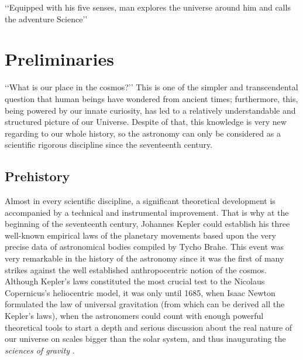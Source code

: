 \begin{savequote}[50mm]
‘‘Equipped with his five senses, man explores the universe around him and 
calls the adventure Science’’
\end{savequote}




\chapter{Preliminaries}
\label{cha:Introduction}


‘‘What is our place in the cosmos?’’ This is one of the simpler and 
trans\-cendental question that human beings have wondered from ancient 
times; furthermore, this, being powered by our innate curiosity, has led to 
a relatively understandable and structured picture of our Universe. Despite 
of that, this knowledge is very new regarding to our whole history, so the 
astronomy can only be considered as a scientific rigorous discipline since 
the seventeenth century.







\section{Prehistory}
\label{sec:Prehistory}


Almost in every scientific discipline, a significant theoretical development 
is accompanied by a technical and instrumental improvement. That is why at 
the beginning of the seventeenth century, Johannes Kepler could establish 
his three well-known empirical laws of the planetary movements based upon 
the very precise data of astronomical bodies compiled by Tycho Brahe. This 
event was very remarkable in the history of the astronomy since it was the 
first of many strikes against the well established anthropocentric notion 
of the cosmos. Although Kepler's laws constituted the most crucial test to 
the Nicolaus Copernicus's heliocentric model, it was only until 1685, when 
Isaac Newton formulated the law of universal gravitation (from which can be 
derived all the Kepler's laws), when the astronomers could count with 
enough powerful theoretical tools to start a depth and serious discussion 
about the real nature of our universe on scales bigger than the solar 
system, and thus inaugurating the \textit{sciences of gravity} 
\cite{longair2008}.



